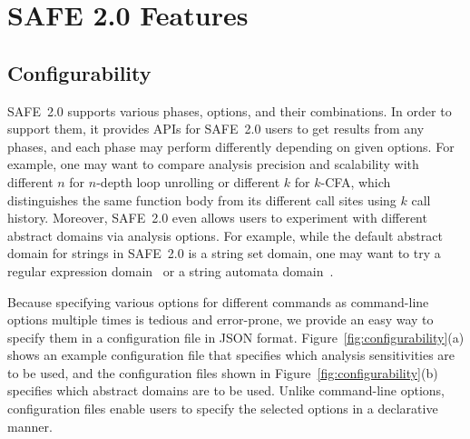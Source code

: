 \documentclass[10pt, conference]{IEEEtran}
\newcommand{\safe}{{SAFE~2.0}\xspace}
\begin{document}
\section{SAFE 2.0 Features}

\subsection{Configurability}
\safe supports various phases, options, and their combinations.
In order to support them, it provides APIs for \safe users to get results
from any phases, and each phase may perform differently depending on
given options.  For example, one may want to compare analysis precision
and scalability with different $n$ for $n$-depth loop unrolling or
different $k$ for $k$-CFA, which distinguishes the same function body
from its different call sites using $k$ call history.  Moreover, \safe even
allows users to experiment with different abstract domains via analysis
options.  For example, while the default abstract domain for strings in
\safe is a string set domain, one may want to try a regular expression
domain~\cite{dls16} or a string automata domain~\cite{aplas14}.


Because specifying various options for different commands as
command-line options multiple times is tedious and error-prone,
we provide an easy way to specify them in a configuration file in
JSON format.  Figure~\ref{fig:configurability}(a) shows an example
configuration file that specifies which analysis sensitivities are to be
used, and the configuration files shown in
Figure~\ref{fig:configurability}(b) specifies which abstract domains
are to be used.  Unlike command-line options,
configuration files enable users to specify the selected options
in a declarative manner.
\end{document}
